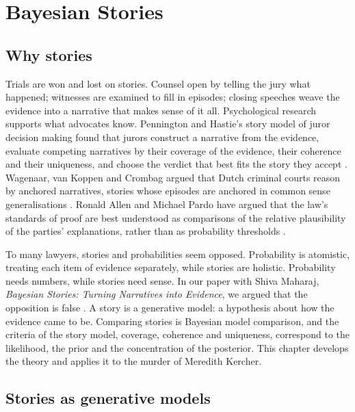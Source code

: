 \chapter{Bayesian Stories}
\label{ch:stories}

\section{Why stories}

Trials are won and lost on stories. Counsel open by telling the jury what happened; witnesses are examined to fill in episodes; closing speeches weave the evidence into a narrative that makes sense of it all. Psychological research supports what advocates know. Pennington and Hastie's story model of juror decision making found that jurors construct a narrative from the evidence, evaluate competing narratives by their coverage of the evidence, their coherence and their uniqueness, and choose the verdict that best fits the story they accept \citep{pennington1991}. Wagenaar, van Koppen and Crombag argued that Dutch criminal courts reason by anchored narratives, stories whose episodes are anchored in common sense generalisations \citep{wagenaar1993}. Ronald Allen and Michael Pardo have argued that the law's standards of proof are best understood as comparisons of the relative plausibility of the parties' explanations, rather than as probability thresholds \citep{allen2019}.

To many lawyers, stories and probabilities seem opposed. Probability is atomistic, treating each item of evidence separately, while stories are holistic. Probability needs numbers, while stories need sense. In our paper with Shiva Maharaj, \emph{Bayesian Stories: Turning Narratives into Evidence}, we argued that the opposition is false \citep{polson_maharaj_stories}. A story is a generative model: a hypothesis about how the evidence came to be. Comparing stories is Bayesian model comparison, and the criteria of the story model, coverage, coherence and uniqueness, correspond to the likelihood, the prior and the concentration of the posterior. This chapter develops the theory and applies it to the murder of Meredith Kercher.

\section{Stories as generative models}

